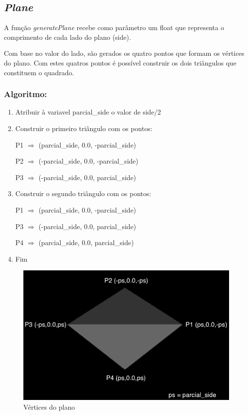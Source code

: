 \documentclass[a4paper]{article}
\begin{document}
\newpage

\subsection{\textit{Plane}}
\label{sec:plane}
A função \textit{generatePlane} recebe como parâmetro um float que representa o comprimento de cada lado do plano (side).

Com base no valor do lado, são gerados os quatro pontos que formam os vértices do plano. Com estes quatros pontos é possível construir os dois triângulos que constituem o quadrado.

\subsubsection{Algoritmo:}

\ttfamily
\begin{enumerate}
  \item Atribuir à variavel parcial\_side o valor de side/2
  \item Construir o primeiro triângulo com os pontos:

        \hspace{2cm} P1 $\Rightarrow$ (parcial\_side, 0.0, -parcial\_side)

        \hspace{2cm} P2 $\Rightarrow$ (-parcial\_side, 0.0, -parcial\_side)

        \hspace{2cm} P3 $\Rightarrow$ (-parcial\_side, 0.0, parcial\_side)
  \item Construir o segundo triângulo com os pontos:

        \hspace{2cm} P1 $\Rightarrow$ (parcial\_side, 0.0, -parcial\_side)

        \hspace{2cm} P3 $\Rightarrow$ (-parcial\_side, 0.0, parcial\_side)

        \hspace{2cm} P4 $\Rightarrow$ (parcial\_side, 0.0, parcial\_side)
  \item Fim
\end{enumerate}
\rmfamily

\begin{figure}[H]
\centering
\includegraphics[scale=0.50]{plane.png}
\caption{Vértices do plano}
\label{img:glulookat}
\end{figure}
\end{document}
